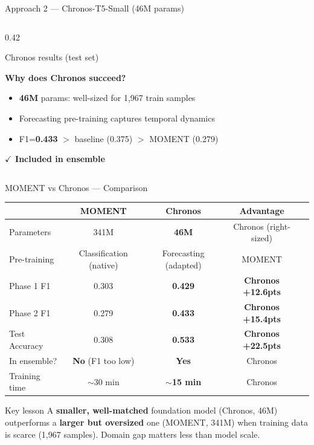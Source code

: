 \documentclass[aspectratio=169, 10pt]{beamer}
\begin{document}
\begin{frame}{Approach 2 — Chronos-T5-Small (46M params)}
\begin{columns}
\begin{column}{0.42\textwidth}
\begin{block}{Chronos results (test set)}
\begin{center}
        \end{center}
      \end{block}
      \vspace{0.2em}
      \small\textbf{Why does Chronos succeed?}
      \begin{itemize}\setlength\itemsep{1pt}
        \item \textbf{46M} params: well-sized for 1,967 train samples
        \item Forecasting pre-training captures temporal dynamics
        \item F1=\textbf{0.433} $>$ baseline (0.375) $>$ MOMENT (0.279)
      \end{itemize}
      \vspace{0.2em}
      \small \textcolor{mygreen}{\textbf{$\checkmark$ Included in ensemble}}
    \end{column}
  \end{columns}
\end{frame}

\begin{frame}{MOMENT vs Chronos — Comparison}
  \begin{center}
  \begin{tabular}{lcccc}
    \toprule
    & \textbf{MOMENT} & \textbf{Chronos} & Advantage \\
    \midrule
    Parameters     & 341M & \textbf{46M} & Chronos (right-sized) \\
    Pre-training   & Classification (native) & Forecasting (adapted) & MOMENT \\
    Phase 1 F1     & 0.303 & \textbf{0.429} & \textbf{Chronos +12.6pts} \\
    Phase 2 F1     & 0.279 & \textbf{0.433} & \textbf{Chronos +15.4pts} \\
    Test Accuracy  & 0.308 & \textbf{0.533} & \textbf{Chronos +22.5pts} \\
    In ensemble?   & \textcolor{myred}{\textbf{No}} (F1 too low) & \textcolor{mygreen}{\textbf{Yes}} & Chronos \\
    Training time  & $\sim$30 min & \textbf{$\sim$15 min} & Chronos \\
    \bottomrule
  \end{tabular}
  \end{center}
  \vspace{0.5em}
  \begin{block}{Key lesson}
    A \textbf{smaller, well-matched} foundation model (Chronos, 46M)
    outperforms a \textbf{larger but oversized} one (MOMENT, 341M)
    when training data is scarce (1,967 samples).
    Domain gap matters less than model scale.
  \end{block}
\end{frame}
\end{document}
